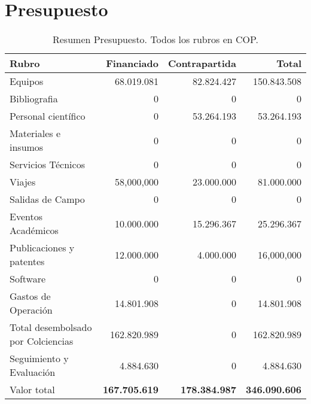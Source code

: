 
\section{Presupuesto}

\begin{table}[h]
\begin{center}
\begin{tabular}{|l|r|r|r|}\hline
\textbf{Rubro} 	& {\bf Financiado} & {\bf Contrapartida} & {\bf Total}\\\hline 
Equipos	& 68.019.081 &	82.824.427 &	150.843.508\\\hline
Bibliografia	&0	&0	&0 \\\hline
Personal científico	&0	&53.264.193	&53.264.193\\\hline
Materiales e insumos	&0	&0	&0\\\hline
Servicios Técnicos	&0	&0	&0\\\hline
Viajes	&58,000,000	&23.000.000	&81.000.000\\\hline
Salidas de Campo	&0	&0	&0\\\hline
Eventos Académicos	&10.000.000	&15.296.367	&25.296.367\\\hline
Publicaciones y patentes&	12.000.000	&4.000.000	&16,000,000\\\hline
Software&	0	&0	&0\\\hline
Gastos de Operación&	14.801.908	&0	&14.801.908\\\hline
Total desembolsado por Colciencias&	162.820.989	&0	&162.820.989\\\hline
Seguimiento y Evaluación&	 4.884.630	&0	&4.884.630\\\hline
Valor total&	{\bf 167.705.619}	& {\bf 178.384.987}	&{\bf 346.090.606}\\\hline

\end{tabular} 
\caption{Resumen Presupuesto. Todos los rubros en COP.}
\end{center}
\label{Resumen Presupuesto}
\end{table}


